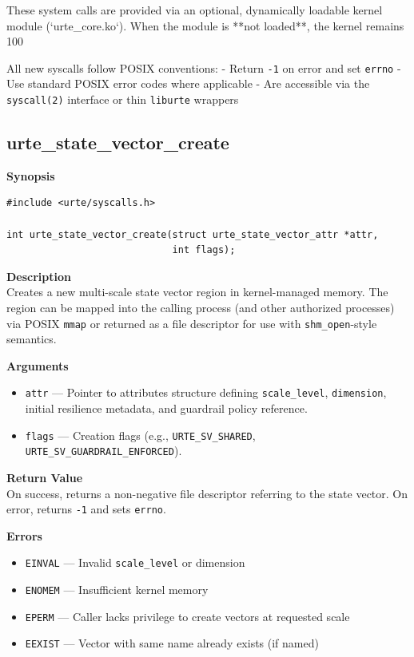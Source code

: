 \documentclass[11pt,a4paper]{report}
\begin{document}
These system calls are provided via an optional, dynamically loadable kernel module (`urte\_core.ko`). When the module is **not loaded**, the kernel remains 100%

All new syscalls follow POSIX conventions:
- Return \texttt{-1} on error and set \texttt{errno}
- Use standard POSIX error codes where applicable
- Are accessible via the \texttt{syscall(2)} interface or thin \texttt{liburte} wrappers

\subsection{urte\_state\_vector\_create}

\textbf{Synopsis}
\begin{verbatim}
#include <urte/syscalls.h>

int urte_state_vector_create(struct urte_state_vector_attr *attr,
                             int flags);
\end{verbatim}

\textbf{Description}\\
Creates a new multi-scale state vector region in kernel-managed memory. The region can be mapped into the calling process (and other authorized processes) via POSIX \texttt{mmap} or returned as a file descriptor for use with \texttt{shm\_open}-style semantics.

\textbf{Arguments}
\begin{itemize}
    \item \texttt{attr} — Pointer to attributes structure defining \texttt{scale\_level}, \texttt{dimension}, initial resilience metadata, and guardrail policy reference.
    \item \texttt{flags} — Creation flags (e.g., \texttt{URTE\_SV\_SHARED}, \texttt{URTE\_SV\_GUARDRAIL\_ENFORCED}).
\end{itemize}

\textbf{Return Value}\\
On success, returns a non-negative file descriptor referring to the state vector. On error, returns \texttt{-1} and sets \texttt{errno}.

\textbf{Errors}
\begin{itemize}
    \item \texttt{EINVAL} — Invalid \texttt{scale\_level} or dimension
    \item \texttt{ENOMEM} — Insufficient kernel memory
    \item \texttt{EPERM} — Caller lacks privilege to create vectors at requested scale
    \item \texttt{EEXIST} — Vector with same name already exists (if named)
\end{itemize}
\end{document}
